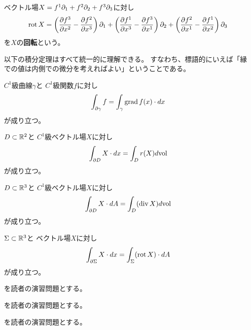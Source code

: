 \documentclass[report]{jlreq}
\begin{document}
\begin{definition}[回転]
    ベクトル場$X = f^1 \partial_1 + f^2 \partial_2 + f^3 \partial_3$に対し
    \begin{equation}
        \Rot X
            = \left( \deldel[f^3]{x^2} - \deldel[f^2]{x^3} \right) \del_1
            + \left( \deldel[f^1]{x^3} - \deldel[f^3]{x^1} \right) \del_2
            + \left( \deldel[f^2]{x^1} - \deldel[f^1]{x^2} \right) \del_3
    \end{equation}
    を$X$の\textbf{回転}という。
\end{definition}

以下の積分定理はすべて統一的に理解できる。
すなわち、標語的にいえば「縁での値は内側での微分を考えればよい」ということである。

\begin{theorem}[勾配ベクトル場に関する積分定理]
    $C^1$級曲線$\gamma$と
    $C^1$級関数$f$に対し
    \begin{equation}
        \int_{\partial \gamma} f
            = \int_\gamma \operatorname{\mathrm{grad}} f(x) \cdot dx
    \end{equation}
    が成り立つ。
\end{theorem}

\begin{theorem}[グリーンの定理]
    $D \subset \mathbb{R}^2$と
    $C^1$級ベクトル場$X$に対し
    \begin{equation}
        \int_{\partial D} X \cdot dx = \int_D r(X) d\mathrm{vol}
    \end{equation}
    が成り立つ。
\end{theorem}

\begin{theorem}
    $D \subset \mathbb{R}^3$と
    $C^1$級ベクトル場$X$に対し
    \begin{equation}
        \int_{\partial D} X \cdot dA = \int_D (\operatorname{\mathrm{div}} X) d\mathrm{vol}
    \end{equation}
    が成り立つ。
\end{theorem}

\begin{theorem}[ストークスの定理]
    $\Sigma \subset \mathbb{R}^3$と
    ベクトル場$X$に対し
    \begin{equation}
        \int_{\partial \Sigma} X \cdot dx = \int_\Sigma (\operatorname{\mathrm{rot}} X) \cdot dA
    \end{equation}
    が成り立つ。
\end{theorem}

\begin{problem}[グリーンの定理]
    \cite[第IV章 問題7.2 (1)-(5)]{杉浦+89}を読者の演習問題とする。
\end{problem}

\begin{problem}[ストークスの定理]
    \cite[第IV章 問題7.7 (1)-(5)]{杉浦+89}を読者の演習問題とする。
\end{problem}

\begin{problem}[ガウスの発散定理]
    \cite[第IV章 問題7.11 (1)-(5)]{杉浦+89}を読者の演習問題とする。
\end{problem}
\end{document}
